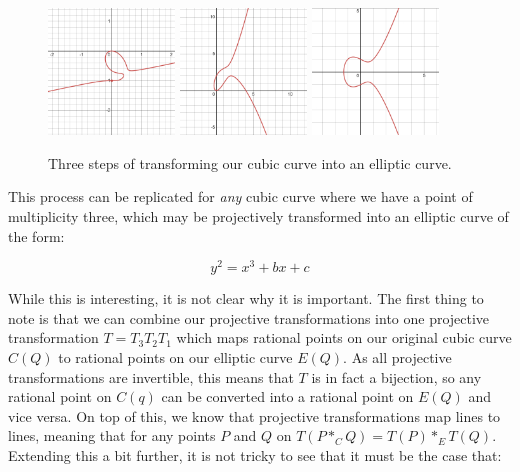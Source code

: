 \documentclass{article}
\begin{document}
\begin{figure}
\centering
\includegraphics[width=0.3\textwidth]{desmos-graph (2-0).png}
\includegraphics[width=0.3\textwidth]{desmos-graph (2-1).png}
\includegraphics[width=0.3\textwidth]{desmos-graph (2-3).png}
\caption{\label{fig:into curve} Three steps of transforming our cubic curve into an elliptic curve.}
\end{figure}

This process can be replicated for \emph{any} cubic curve where we have a point of multiplicity three, which may be projectively transformed into an elliptic curve of the form:

\[y^2 = x^3 + bx + c\]

While this is interesting, it is not clear why it is important. The first thing to note is that we can combine our projective transformations into one  projective transformation $T = T_3 T_2 T_1$ which maps rational points on our original cubic curve $C(Q)$ to rational points on our elliptic curve $E(Q)$. As all projective transformations are invertible, this means that $T$ is in fact a bijection, so any rational point on $C(q)$ can be converted into a rational point on $E(Q)$ and vice versa. On top of this, we know that projective transformations map lines to lines, meaning that for any points $P$ and $Q$ on $T(P *_C Q) = T(P) *_E T(Q)$. Extending this a bit further, it is not tricky to see that it must be the case that:
\end{document}
